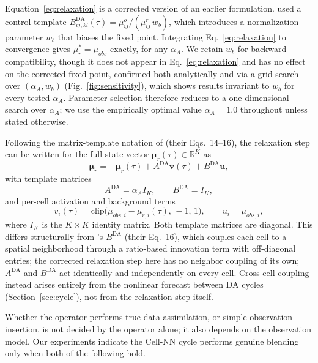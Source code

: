 \documentclass[final,5p,times,twocolumn,authoryear]{elsarticle}
\begin{document}
Equation~\eqref{eq:relaxation} is a corrected version of an earlier
formulation. \citet{magno2025} used a control template
$B^\text{DA}_{ij,kl}(\tau) = \mu^o_{ij}/(\mu^r_{ij}\,w_b)$, which
introduces a normalization parameter $w_b$ that biases the fixed
point. Integrating Eq.~\eqref{eq:relaxation} to convergence gives
$\mu_r^{\ast} = \mu_{obs}$ exactly, for any $\alpha_A$. We retain
$w_b$ for backward compatibility, though it does not appear in
Eq.~\eqref{eq:relaxation} and has no effect on the corrected fixed
point, confirmed both analytically and via a grid search over
$(\alpha_A, w_b)$ (Fig.~\ref{fig:sensitivity}), which shows results
invariant to $w_b$ for every tested $\alpha_A$. Parameter selection
therefore reduces to a one-dimensional search over $\alpha_A$; we
use the empirically optimal value $\alpha_A=1.0$ throughout unless
stated otherwise.

Following the matrix-template notation of \citet{magno2025} (their
Eqs.~14--16), the relaxation step can be written for the full state
vector $\boldsymbol{\mu}_r(\tau) \in \mathbb{R}^K$ as
\begin{equation}
\dot{\boldsymbol{\mu}}_r = -\boldsymbol{\mu}_r(\tau) +
A^\text{DA}\mathbf{v}(\tau) + B^\text{DA}\mathbf{u},
\label{eq:relaxation_matrix}
\end{equation}
with template matrices
\begin{equation}
A^\text{DA} = \alpha_A I_K, \qquad B^\text{DA} = I_K,
\label{eq:relaxation_AB}
\end{equation}
and per-cell activation and background terms
\begin{equation}
v_i(\tau) = \mathrm{clip}\bigl(\mu_{obs,i} - \mu_{r,i}(\tau),\, -1,\,
1\bigr), \qquad u_i = \mu_{obs,i},
\end{equation}
where $I_K$ is the $K\times K$ identity matrix. Both template
matrices are diagonal. This differs structurally from
\citet{magno2025}'s $B^\text{DA}$ (their Eq.~16), which couples each
cell to a spatial neighborhood through a ratio-based innovation term
with off-diagonal entries; the corrected relaxation step here has no
neighbor coupling of its own; $A^\text{DA}$ and $B^\text{DA}$ act
identically and independently on every cell. Cross-cell coupling
instead arises entirely from the nonlinear forecast between DA
cycles (Section~\ref{sec:cycle}), not from the relaxation step
itself.

Whether the operator performs true data assimilation, or simple
observation insertion, is not decided by the operator alone; it also
depends on the observation model. Our experiments indicate the
Cell-NN cycle performs genuine blending only when both of the
following hold.
\end{document}
